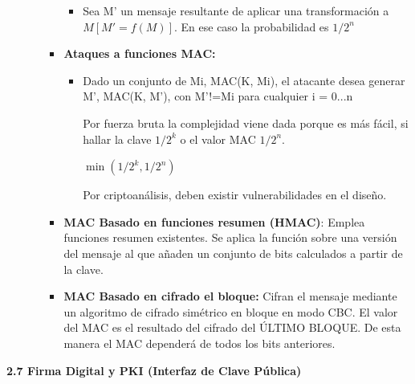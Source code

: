 \documentclass[12pt, twoside, openright]{report} %
\begin{document}
\begin{itemize}
\begin{itemize}
\begin{itemize}
\begin{itemize}
        \item Sea M' un mensaje resultante de aplicar una transformación a
         $ M[M'= f(M)]$. En ese caso la probabilidad es $1/2^n$
          
        \end{itemize}
      \item \textbf{Ataques a funciones MAC:}
        

        \begin{itemize}
        \item Dado un conjunto de Mi, MAC(K, Mi), el atacante desea generar
          M', MAC(K, M'), con M'!=Mi para cualquier i = 0...n
          

          
		  
            Por fuerza bruta la complejidad viene dada porque es más
            fácil, si hallar la clave $1/2^k$ o el valor MAC $1/2^n$.
          
			
            \textbf{\underline{$\min(1/2^k, 1/2^n)$}}
         
			
            Por criptoanálisis, deben existir vulnerabilidades en el
            diseño.
 
			
        \end{itemize}
      \item \textbf{MAC Basado en funciones resumen (HMAC)}: Emplea
        funciones resumen existentes. Se aplica la función sobre una
        versión del mensaje al que añaden un conjunto de bits calculados
        a partir de la clave.
        
      \item \textbf{MAC Basado en cifrado el bloque:} Cifran el mensaje
        mediante un algoritmo de cifrado simétrico en bloque en modo
        CBC. El valor del MAC es el resultado del cifrado del ÚLTIMO
        BLOQUE. De esta manera el MAC dependerá de todos los bits
        anteriores.
        
      \end{itemize}
    \end{itemize}
  \end{itemize}

  
  \textbf{2.7 Firma Digital y PKI (Interfaz de Clave Pública)}
  
\end{document}
